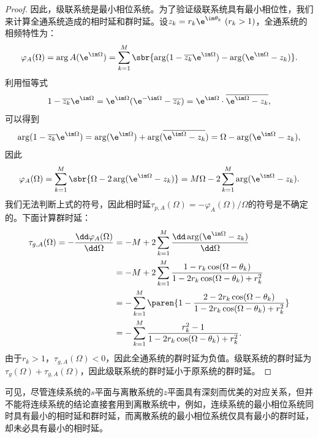 \begin{proof}
    因此，级联系统是最小相位系统。为了验证级联系统具有最小相位性，我们来计算全通系统造成的相时延和群时延。设$z_k=r_k \e^{\im\theta_k}\ (r_k>1)$，全通系统的相频特性为：
    \begin{equation}
        \varphi_A(\Omega)=\arg A(\e^{\im\Omega})=\sum_{k=1}^{M}\sbr{\arg(1-\overline{z_k}\e^{\im\Omega})-\arg(\e^{\im\Omega}-z_k)}.
    \end{equation}
    利用恒等式
    \begin{equation}
        1-\overline{z_k} \e^{\im\Omega}=\e^{\im\Omega}(\e^{-\im\Omega}-\overline{z_k})=\e^{\im\Omega}\cdot\overline{\e^{\im\Omega}-z_k},
    \end{equation}
    可以得到
    \begin{equation}
        \arg(1-\overline{z_k}\e^{\im\Omega})=\arg(\e^{\im\Omega})+\arg(\overline{\e^{\im\Omega}-z_k})=\Omega-\arg(\e^{\im\Omega}-z_k),
    \end{equation}
    因此
    \begin{equation}
        \varphi_A(\Omega)=\sum_{k=1}^{M}\sbr{\Omega-2\arg(\e^{\im\Omega}-z_k)}=M\Omega-2\sum_{k=1}^{M}\arg(\e^{\im\Omega}-z_k).
    \end{equation}
    我们无法判断上式的符号，因此相时延$\tau_{p,A}(\Omega)=-\varphi_A(\Omega)/\Omega$的符号是不确定的。下面计算群时延：
    \begin{align}
        \tau_{g,A}(\Omega)=-\frac{\dd\varphi_A(\Omega)}{\dd\Omega}&=-M+2\sum_{k=1}^{M}\frac{\dd\arg(\e^{\im\Omega}-z_k)}{\dd\Omega} \nonumber \\
        &=-M+2\sum_{k=1}^{M}\frac{1-r_k\cos(\Omega-\theta_k)}{1-2r_k\cos(\Omega-\theta_k)+r_k^2} \nonumber \\
        &=-\sum_{k=1}^{M}\paren{1-\frac{2-2r_k\cos(\Omega-\theta_k)}{1-2r_k\cos(\Omega-\theta_k)+r_k^2}} \nonumber \\
        &=-\sum_{k=1}^{M}\frac{r_k^2-1}{1-2r_k\cos(\Omega-\theta_k)+r_k^2}.
    \end{align}
    由于$r_k>1$，$\tau_{g,A}(\Omega)<0$，因此全通系统的群时延为负值。级联系统的群时延为$\tau_g(\Omega)+\tau_{g,A}(\Omega)$，因此级联系统的群时延小于原系统的群时延。
\end{proof}

可见，尽管连续系统的$s$平面与离散系统的$z$平面具有深刻而优美的对应关系，但并不能将连续系统的结论直接套用到离散系统中，例如，连续系统的最小相位系统同时具有最小的相时延和群时延，而离散系统的最小相位系统仅具有最小的群时延，却未必具有最小的相时延。
